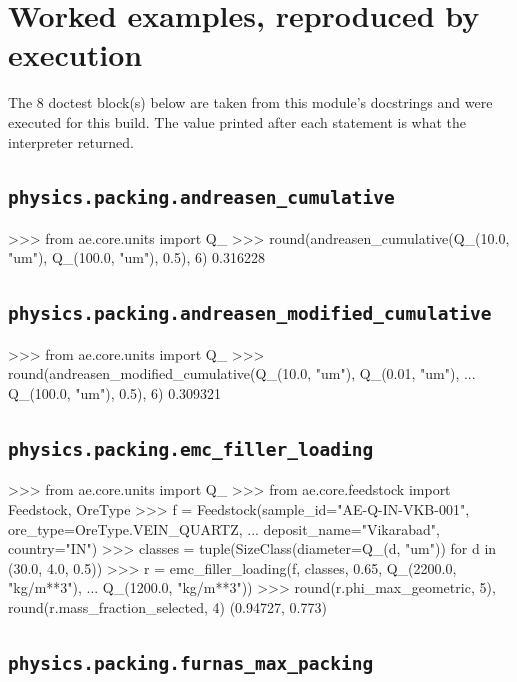 \documentclass[10pt,a4paper,twoside]{report}
\begin{document}
\section{Worked examples, reproduced by execution}

The 8 doctest block(s) below are taken from this module's docstrings and were executed for this build. The value printed after each statement is what the interpreter returned.

\subsection*{\texttt{physics.packing.andreasen\_cumulative}}

\begin{doctestblock}
>>> from ae.core.units import Q_
>>> round(andreasen_cumulative(Q_(10.0, "um"), Q_(100.0, "um"), 0.5), 6)
0.316228
\end{doctestblock}

\subsection*{\texttt{physics.packing.andreasen\_modified\_cumulative}}

\begin{doctestblock}
>>> from ae.core.units import Q_
>>> round(andreasen_modified_cumulative(Q_(10.0, "um"), Q_(0.01, "um"),
...                                     Q_(100.0, "um"), 0.5), 6)
0.309321
\end{doctestblock}

\subsection*{\texttt{physics.packing.emc\_filler\_loading}}

\begin{doctestblock}
>>> from ae.core.units import Q_
>>> from ae.core.feedstock import Feedstock, OreType
>>> f = Feedstock(sample_id="AE-Q-IN-VKB-001", ore_type=OreType.VEIN_QUARTZ,
...               deposit_name="Vikarabad", country="IN")
>>> classes = tuple(SizeClass(diameter=Q_(d, "um")) for d in (30.0, 4.0, 0.5))
>>> r = emc_filler_loading(f, classes, 0.65, Q_(2200.0, "kg/m**3"),
...                        Q_(1200.0, "kg/m**3"))
>>> round(r.phi_max_geometric, 5), round(r.mass_fraction_selected, 4)
(0.94727, 0.773)
\end{doctestblock}

\subsection*{\texttt{physics.packing.furnas\_max\_packing}}
\end{document}
